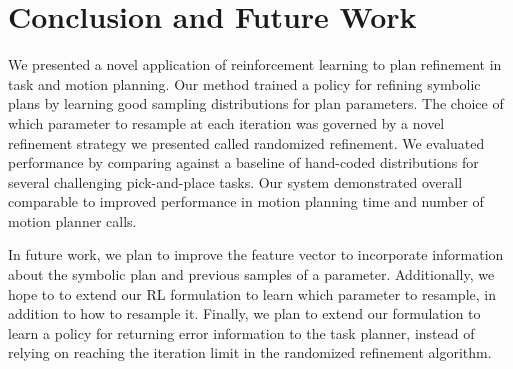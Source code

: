 \section{Conclusion and Future Work}
We presented a novel application of reinforcement learning to plan refinement in task
and motion planning. Our method trained a policy for refining symbolic plans
by learning good sampling distributions for plan parameters. The choice
of which parameter to resample at each iteration was governed by a novel
refinement strategy we presented called randomized refinement. We evaluated
performance by comparing against a baseline of hand-coded distributions
for several challenging pick-and-place tasks. Our system demonstrated overall comparable
to improved performance in motion planning time and number of motion planner calls.

In future work, we plan to improve the feature vector to incorporate information about
the symbolic plan and previous samples of a parameter. Additionally, we hope to
to extend our RL formulation to learn which parameter to resample, in addition to how
to resample it. Finally, we plan to extend our formulation to learn a policy for
returning error information to the task planner, instead of relying on reaching
the iteration limit in the randomized refinement algorithm.
